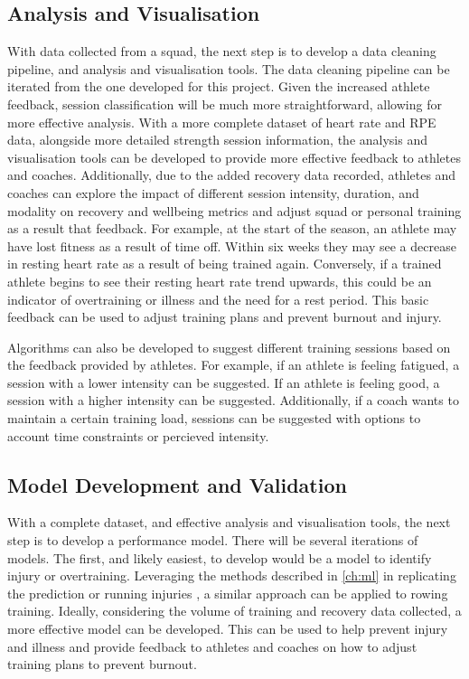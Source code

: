 \subsection{Analysis and Visualisation}
With data collected from a squad, the next step is to develop a data cleaning pipeline, and analysis and visualisation tools. The data cleaning pipeline can be iterated from the one developed for this project. Given the increased athlete feedback, session classification will be much more straightforward, allowing for more effective analysis. With a more complete dataset of heart rate and RPE data, alongside more detailed strength session information, the analysis and visualisation tools can be developed to provide more effective feedback to athletes and coaches. Additionally, due to the added recovery data recorded, athletes and coaches can explore the impact of different session intensity, duration, and modality on recovery and wellbeing metrics and adjust squad or personal training as a result that feedback. For example, at the start of the season, an athlete may have lost fitness as a result of time off. Within six weeks they may see a decrease in resting heart rate as a result of being trained again. Conversely, if a trained athlete begins to see their resting heart rate trend upwards, this could be an indicator of overtraining or illness and the need for a rest period. This basic feedback can be used to adjust training plans and prevent burnout and injury.

Algorithms can also be developed to suggest different training sessions based on the feedback provided by athletes. For example, if an athlete is feeling fatigued, a session with a lower intensity can be suggested. If an athlete is feeling good, a session with a higher intensity can be suggested. Additionally, if a coach wants to maintain a certain training load, sessions can be suggested with options to account time constraints or percieved intensity.

\subsection{Model Development and Validation}
With a complete dataset, and effective analysis and visualisation tools, the next step is to develop a performance model. There will be several iterations of models. The first, and likely easiest, to develop would be a model to identify injury or overtraining. Leveraging the methods described in \autoref{ch:ml} in replicating the prediction or running injuries \cite{Lovdal2021}, a similar approach can be applied to rowing training. Ideally, considering the volume of training and recovery data collected, a more effective model can be developed. This can be used to help prevent injury and illness and provide feedback to athletes and coaches on how to adjust training plans to prevent burnout.

